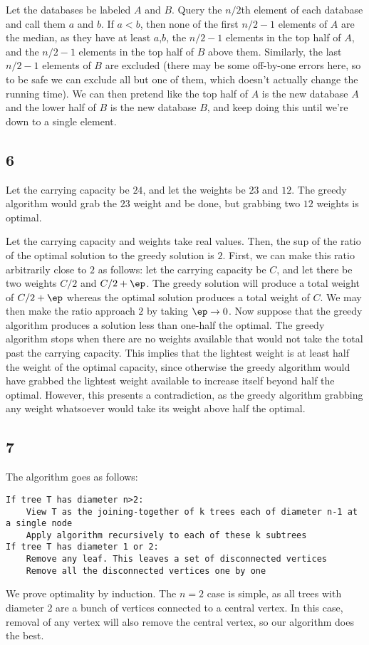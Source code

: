 \documentclass{article}
\begin{document}
Let the databases be labeled $A$ and $B$. Query the $n/2$th element of each database and call them $a$ and $b$. If $a<b$, then none of the first $n/2-1$ elements of $A$ are the median, as they have at least $a$,$b$, the $n/2-1$ elements in the top half of $A$, and the $n/2-1$ elements in the top half of $B$ above them. Similarly, the last $n/2-1$ elements of $B$ are excluded (there may be some off-by-one errors here, so to be safe we can exclude all but one of them, which doesn't actually change the running time). We can then pretend like the top half of $A$ is the new database $A$ and the lower half of $B$ is the new database $B$, and keep doing this until we're down to a single element.
\subsection*{6}
Let the carrying capacity be $24$, and let the weights be $23$ and $12$. The greedy algorithm would grab the $23$ weight and be done, but grabbing two $12$ weights is optimal. 

Let the carrying capacity and weights take real values. Then, the sup of the ratio of the optimal solution to the greedy solution is $2$. First, we can make this ratio arbitrarily close to $2$ as follows: let the carrying capacity be $C$, and let there be two weights $C/2$ and $C/2+\ep$. The greedy solution will produce a total weight of $C/2+\ep$ whereas the optimal solution produces a total weight of $C$. We may then make the ratio approach $2$ by taking $\ep\to0$. Now suppose that the greedy algorithm produces a solution less than one-half the optimal. The greedy algorithm stops when there are no weights available that would not take the total past the carrying capacity. This implies that the lightest weight is at least half the weight of the optimal capacity, since otherwise the greedy algorithm would have grabbed the lightest weight available to increase itself beyond half the optimal. However, this presents a contradiction, as the greedy algorithm grabbing any weight whatsoever would take its weight above half the optimal.
\subsection*{7}
The algorithm goes as follows: 
\begin{verbatim}
If tree T has diameter n>2:
    View T as the joining-together of k trees each of diameter n-1 at a single node
    Apply algorithm recursively to each of these k subtrees
If tree T has diameter 1 or 2:
    Remove any leaf. This leaves a set of disconnected vertices
    Remove all the disconnected vertices one by one
\end{verbatim}
We prove optimality by induction. The $n=2$ case is simple, as all trees with diameter $2$ are a bunch of vertices connected to a central vertex. In this case, removal of any vertex will also remove the central vertex, so our algorithm does the best. 
\end{document}
